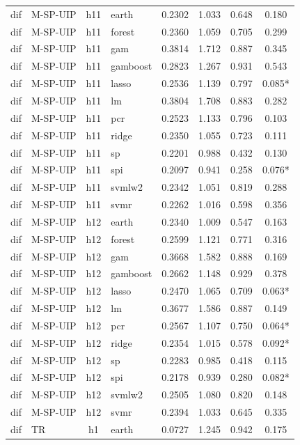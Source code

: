 \begin{ThreePartTable}
\begin{longtable}[t]{llclcccc}
dif & M-SP-UIP & h11 & earth & 0.2302 & 1.033 & 0.648 & 0.180\\
dif & M-SP-UIP & h11 & forest & 0.2360 & 1.059 & 0.705 & 0.299\\
dif & M-SP-UIP & h11 & gam & 0.3814 & 1.712 & 0.887 & 0.345\\
dif & M-SP-UIP & h11 & gamboost & 0.2823 & 1.267 & 0.931 & 0.543\\
dif & M-SP-UIP & h11 & lasso & 0.2536 & 1.139 & 0.797 & 0.085*\\
dif & M-SP-UIP & h11 & lm & 0.3804 & 1.708 & 0.883 & 0.282\\
dif & M-SP-UIP & h11 & pcr & 0.2523 & 1.133 & 0.796 & 0.103\\
dif & M-SP-UIP & h11 & ridge & 0.2350 & 1.055 & 0.723 & 0.111\\
dif & M-SP-UIP & h11 & sp & 0.2201 & 0.988 & 0.432 & 0.130\\
dif & M-SP-UIP & h11 & spi & 0.2097 & 0.941 & 0.258 & 0.076*\\
dif & M-SP-UIP & h11 & svmlw2 & 0.2342 & 1.051 & 0.819 & 0.288\\
dif & M-SP-UIP & h11 & svmr & 0.2262 & 1.016 & 0.598 & 0.356\\
\addlinespace
dif & M-SP-UIP & h12 & earth & 0.2340 & 1.009 & 0.547 & 0.163\\
dif & M-SP-UIP & h12 & forest & 0.2599 & 1.121 & 0.771 & 0.316\\
dif & M-SP-UIP & h12 & gam & 0.3668 & 1.582 & 0.888 & 0.169\\
dif & M-SP-UIP & h12 & gamboost & 0.2662 & 1.148 & 0.929 & 0.378\\
dif & M-SP-UIP & h12 & lasso & 0.2470 & 1.065 & 0.709 & 0.063*\\
dif & M-SP-UIP & h12 & lm & 0.3677 & 1.586 & 0.887 & 0.149\\
dif & M-SP-UIP & h12 & pcr & 0.2567 & 1.107 & 0.750 & 0.064*\\
dif & M-SP-UIP & h12 & ridge & 0.2354 & 1.015 & 0.578 & 0.092*\\
dif & M-SP-UIP & h12 & sp & 0.2283 & 0.985 & 0.418 & 0.115\\
dif & M-SP-UIP & h12 & spi & 0.2178 & 0.939 & 0.280 & 0.082*\\
dif & M-SP-UIP & h12 & svmlw2 & 0.2505 & 1.080 & 0.820 & 0.148\\
dif & M-SP-UIP & h12 & svmr & 0.2394 & 1.033 & 0.645 & 0.335\\
\addlinespace
dif & TR & h1 & earth & 0.0727 & 1.245 & 0.942 & 0.175\\

\end{longtable}
\end{ThreePartTable}
